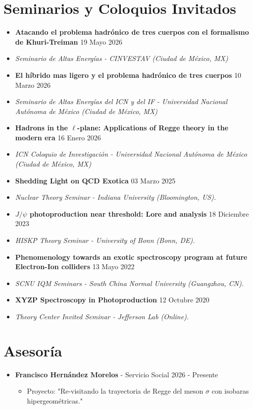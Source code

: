 \documentclass[letterpaper,11pt]{article}
\newcommand{\outerlist}[1]{
    \begin{itemize}[leftmargin=*] #1 \end{itemize}}
\newcommand{\denseouterlist}[1]{
    \begin{itemize}[leftmargin=*,itemsep=0pt] #1 \end{itemize}}
\newcommand{\innerlist}[1]{
    \begin{itemize}[topsep=0pt] #1 \end{itemize}}
\newcommand{\entry}[1]{\item\small{#1}}
\newcommand{\entrymid}[4][]{
    \item[#1] \small{#2} \hfill \small{#3}
    \vspace{-\smallskipamount} \item[]\small{\textit{#4}}}
\begin{document}

\section{Seminarios y Coloquios Invitados}
\denseouterlist
{
    \entrymid[\textbullet]
    {\textbf{Atacando el problema hadrónico de tres cuerpos con el formalismo de Khuri-Treiman}}{19 Mayo 2026}{Seminario de Altas Energías - CINVESTAV (Ciudad de México, MX)   
    }

    \entrymid[\textbullet]
    {\textbf{El híbrido mas ligero y el problema hadrónico de tres cuerpos }}{10 Marzo 2026}{Seminario de Altas Energías del ICN y del IF - Universidad Nacional Autónoma de México (Ciudad de México, MX)   
    }

    \entrymid[\textbullet]
    {\textbf{Hadrons in the $\ell$-plane: Applications of Regge theory in the modern era}}{16 Enero 2026}{ICN Coloquio de Investigación - Universidad Nacional Autónoma de México (Ciudad de México, MX)   
    }

    \entrymid[\textbullet]
    {\textbf{Shedding Light on QCD Exotica}}{03 Marzo 2025}{Nuclear Theory Seminar - Indiana University (Bloomington, US). 
    }


    \entrymid[\textbullet]
    {\textbf{$J/\psi$ photoproduction near threshold: Lore and analysis}}{18 Diciembre 2023}{HISKP Theory Seminar - University of Bonn (Bonn, DE). 
    }

    \entrymid[\textbullet]
    {\textbf{Phenomenology towards an exotic spectroscopy program at future Electron-Ion colliders
    }}{13 Mayo 2022}{SCNU IQM Seminars - South China Normal University (Guangzhou, CN).
    }

    \entrymid[\textbullet]
    {\textbf{XYZP Spectroscopy in Photoproduction}}{12 Octubre 2020}{Theory Center Invited Seminar - Jefferson Lab (Online).
    }
}


\section{Asesoría}
\outerlist{
    \entry{\textbf{Francisco Hernández Morelos} - Servicio Social \hfill 2026 - Presente}
        \innerlist{
            \entry{Proyecto: "Re-visitando la trayectoria de Regge del meson $\sigma$ con isobaras hipergeométricas."}
        }
}
\end{document}
